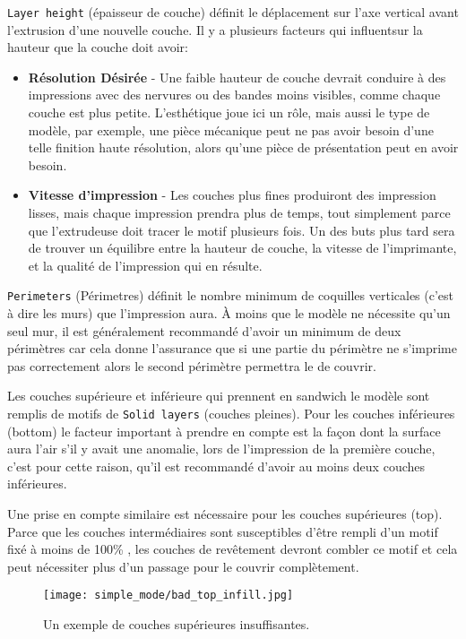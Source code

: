 \texttt{Layer height} (épaisseur de couche) définit le déplacement sur l'axe vertical avant l'extrusion d'une nouvelle couche.  Il y a plusieurs facteurs qui influentsur la hauteur que la couche doit avoir:
\begin{itemize}
	\item \textbf{Résolution Désirée}  - Une faible hauteur de couche devrait conduire à des impressions avec des nervures ou des bandes moins visibles, comme chaque couche est plus petite. L'esthétique joue ici un rôle, mais aussi le type de modèle, par exemple, une pièce mécanique peut ne pas avoir besoin d'une telle finition haute résolution, alors qu'une pièce de présentation peut en avoir besoin.
	\item \textbf{Vitesse d'impression}  - Les couches plus fines produiront des impression lisses, mais chaque impression prendra plus de temps, tout simplement parce que l'extrudeuse doit tracer le motif plusieurs fois. Un des buts plus tard sera de trouver un équilibre entre la hauteur de couche, la vitesse de l'imprimante, et la qualité de l'impression qui en résulte.
\end{itemize}
\texttt{Perimeters} (Périmetres) définit le nombre minimum de coquilles verticales (c'est à dire les murs) que l'impression aura. À moins que le modèle ne nécessite qu'un seul mur, il est généralement recommandé d'avoir un minimum de deux périmètres car cela donne l'assurance que si une partie du périmètre ne s'imprime pas correctement alors le second périmètre permettra le de couvrir.

Les couches supérieure et inférieure qui prennent en sandwich le modèle sont remplis de motifs de \texttt{Solid layers} (couches pleines). Pour les couches inférieures (bottom) le facteur important à prendre en compte est la façon dont la surface aura l'air s'il y avait une anomalie, lors de l'impression de la première couche, c'est pour cette raison, qu'il est recommandé d'avoir au moins deux couches inférieures.

Une prise en compte similaire est nécessaire pour les couches supérieures (top). Parce que les couches intermédiaires sont susceptibles d'être rempli d'un motif fixé à moins de 100\% , les couches de revêtement devront combler ce motif et cela peut nécessiter plus d'un passage pour le couvrir complètement.

\begin{figure}[H]
\centering
\texttt{[image: simple\_mode/bad\_top\_infill.jpg]}
\caption{Un exemple de couches supérieures insuffisantes.}
\label{fig:bad_top_infill}
\end{figure}

